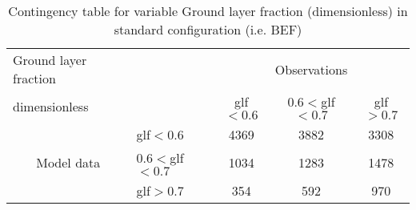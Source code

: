 
\begin{table}[]
\begin{center}
\begin{tabular}{llccc}
\hline
{Ground layer fraction}                                       &                                                    & \multicolumn{3}{c}{Observations}                 \\
{dimensionless}                                       &                             & glf$<0.6$   & $0.6<$glf$<0.7$ & glf$>0.7$ \\
\hline
\multicolumn{1}{c}{\multirow{3}{*}{Model data}}  & glf$<0.6$          & 4369                & 3882                       & 3308              \\
                                                 & $0.6<$glf$<0.7$ & 1034                & 1283                       & 1478              \\
                                                 & glf$>0.7$          & 354                & 592                       & 970              \\
\hline
\end{tabular}
\end{center}
\caption{Contingency table for variable Ground layer fraction (dimensionless) in standard configuration (i.e. BEF)}
\label{tab:contingency}
\end{table}
